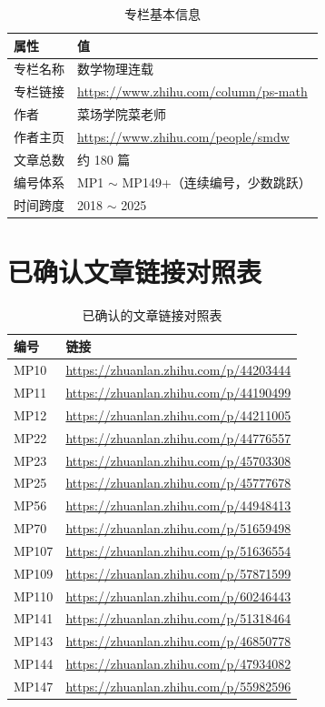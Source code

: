 \documentclass[10pt, openany]{book}
\begin{document}
\begin{table}[ht]
\centering
\begin{tabular}{ll}
\toprule
\textbf{属性} & \textbf{值} \\
\midrule
专栏名称 & 数学物理连载 \\
专栏链接 & \url{https://www.zhihu.com/column/ps-math} \\
作者 & 菜场学院菜老师 \\
作者主页 & \url{https://www.zhihu.com/people/smdw} \\
文章总数 & 约 180 篇 \\
编号体系 & MP1 $\sim$ MP149+（连续编号，少数跳跃） \\
时间跨度 & 2018 $\sim$ 2025 \\
\bottomrule
\end{tabular}
\caption{专栏基本信息}
\end{table}

\section{已确认文章链接对照表}

\begin{table}[ht]
\centering
\begin{tabular}{ll}
\toprule
\textbf{编号} & \textbf{链接} \\
\midrule
MP10 & \url{https://zhuanlan.zhihu.com/p/44203444} \\
MP11 & \url{https://zhuanlan.zhihu.com/p/44190499} \\
MP12 & \url{https://zhuanlan.zhihu.com/p/44211005} \\
MP22 & \url{https://zhuanlan.zhihu.com/p/44776557} \\
MP23 & \url{https://zhuanlan.zhihu.com/p/45703308} \\
MP25 & \url{https://zhuanlan.zhihu.com/p/45777678} \\
MP56 & \url{https://zhuanlan.zhihu.com/p/44948413} \\
MP70 & \url{https://zhuanlan.zhihu.com/p/51659498} \\
MP107 & \url{https://zhuanlan.zhihu.com/p/51636554} \\
MP109 & \url{https://zhuanlan.zhihu.com/p/57871599} \\
MP110 & \url{https://zhuanlan.zhihu.com/p/60246443} \\
MP141 & \url{https://zhuanlan.zhihu.com/p/51318464} \\
MP143 & \url{https://zhuanlan.zhihu.com/p/46850778} \\
MP144 & \url{https://zhuanlan.zhihu.com/p/47934082} \\
MP147 & \url{https://zhuanlan.zhihu.com/p/55982596} \\
\bottomrule
\end{tabular}
\caption{已确认的文章链接对照表}
\end{table}
\end{document}
